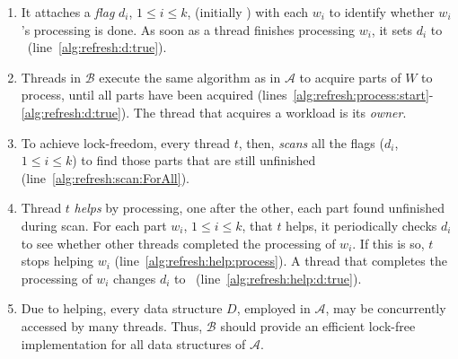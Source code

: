 \newpage

\begin{enumerate}
    \item It attaches a {\em flag} $d_i$, $1 \leq i \leq k$, (initially \False)  
    with each $w_i$ to identify whether $w_i$'s processing is done.  
    As soon as a thread finishes processing $w_i$, it sets $d_i$ to \True\ (line~\ref{alg:refresh:d:true}).  

    \item Threads in $\mathcal{B}$ execute the same algorithm as in $\mathcal{A}$ to acquire parts of $W$ to process,  
    until all parts have been acquired (lines~\ref{alg:refresh:process:start}-\ref{alg:refresh:d:true}).  
    The thread that acquires a workload is its {\em owner}.  

    \item To achieve lock-freedom, every thread $t$, then, {\em scans} all the flags ($d_i$, $1 \leq i \leq k$)  
    to find those parts that are still unfinished (line~\ref{alg:refresh:scan:ForAll}).  

    \item Thread $t$ {\em helps} by processing, one after the other, each part found unfinished during scan.  
    For each part $w_i$, $1 \leq i \leq k$, that $t$ helps, it periodically checks $d_i$  
    to see whether other threads completed the processing of $w_i$. If this is so,  
    $t$ stops helping $w_i$ (line~\ref{alg:refresh:help:process}).  
    A thread that completes the processing of $w_i$ changes $d_i$ to \True\ (line~\ref{alg:refresh:help:d:true}).  

    \item Due to helping, every data structure $D$, employed in $\mathcal{A}$, may be  
    concurrently accessed by many threads. Thus, $\mathcal{B}$ should provide an efficient  
    lock-free implementation for all data structures of $\mathcal{A}$.  
\end{enumerate}


